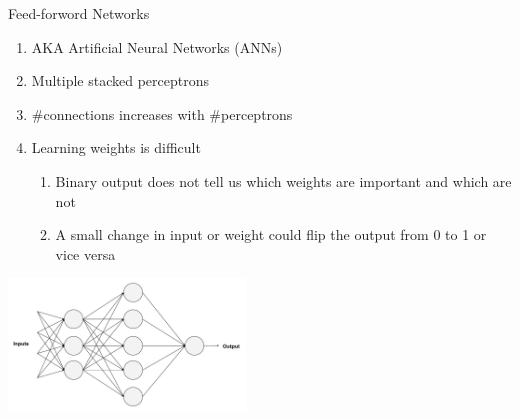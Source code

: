 \documentclass[handout]{beamer}
\begin{document}
\begin{frame}{Feed-forword Networks}
\begin{enumerate}
  \item AKA Artificial Neural Networks (ANNs) \\

  \item Multiple stacked perceptrons \\

  \item \#connections increases with \#perceptrons \\

  \item Learning weights is difficult
    \begin{enumerate}
      \item Binary output does not tell us which weights are important and which are not \\
      \item A small change in input or weight could flip the output from 0 to 1 or vice versa \\
    \end{enumerate}
\end{enumerate}
    \begin{center}
      \includegraphics[width=0.65\linewidth, height=3.5cm]{images/anns}
    \end{center}
\end{frame}
\end{document}
